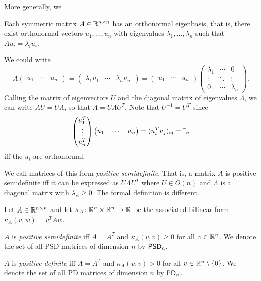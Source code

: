 More generally, we 
\begin{theorem} \label{thm:spectral}
    Each symmetric matrix $A \in \mathbb{R}^{n \times n}$ has an orthonormal
    eigenbasis, that is, there exist orthonormal vectors $u_1, \dots, u_n$
    with eigenvalues $\lambda_1, \dots, \lambda_n$ such that
    $A u_i = \lambda_i u_i$.
\end{theorem}
We could write \[
    A \begin{pmatrix}
        u_1 & \cdots & u_n
    \end{pmatrix} = \begin{pmatrix}
        \lambda_1 u_1 & \cdots & \lambda_n u_n
    \end{pmatrix} = \begin{pmatrix}
        u_1 & \cdots & u_n
    \end{pmatrix} \begin{pmatrix}
        \lambda_1 & \cdots & 0 \\
        \vdots & \ddots & \vdots \\
        0 & \cdots & \lambda_n
    \end{pmatrix}.
\] Calling the matrix of eigenvectors $U$ and the diagonal matrix of
eigenvalues $\Lambda$, we can write $A U = U \Lambda$, so that
$A = U \Lambda U^T$.
Note that $U^{-1} = U^T$ since \[
    \begin{pmatrix}
        u_1^T \\
        \vdots \\
        u_n^T
    \end{pmatrix} \begin{pmatrix}
        u_1 & \cdots & u_n
    \end{pmatrix} = (u_i^T u_j)_{ij} = \mathbb{I}_n
\] iff the $u_i$ are orthonormal.

We call matrices of this form \emph{positive semidefinite}.
That is, a matrix $A$ is positive semidefinite iff it can be expressed as
$U \Lambda U^T$ where $U \in O(n)$ and $\Lambda$ is a diagonal matrix with
$\lambda_{i i} \ge 0$.
The formal definition is different.
\begin{definition} \label{def:psd}
    Let $A \in \mathbb{R}^{n \times n}$ and let
    $\kappa_A\colon \mathbb{R}^n \times \mathbb{R}^n \to \mathbb{R}$ be the associated bilinear form
    $\kappa_A(v, w) = v^T A w$.

    $A$ is \emph{positive semidefinite} iff $A = A^T$ and
    $\kappa_A(v, v) \ge 0$ for all $v \in \mathbb{R}^n$.
    We denote the set of all PSD matrices of dimension $n$ by $\mathsf{PSD}_n$.

    $A$ is \emph{positive definite} iff $A = A^T$ and
    $\kappa_A(v, v) > 0$ for all $v \in \mathbb{R}^n \setminus \{0\}$.
    We denote the set of all PD matrices of dimension $n$ by $\mathsf{PD}_n$.
\end{definition}

